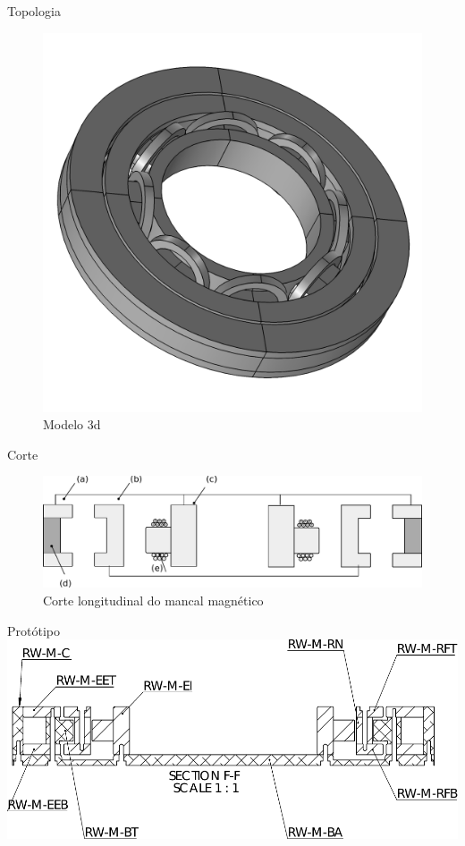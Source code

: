 \documentclass{beamer}
\begin{document}
\begin{frame}{Topologia}
\begin{figure}[th!]
\centering
	\includegraphics[width=0.8\linewidth]{../../Dissertacao/Figs/mancais/modelo-elementos-finitos.png}
\caption*{Modelo 3d}
\end{figure}
\end{frame}

\begin{frame}{Corte}
\begin{figure}[th!]
\centering
\includegraphics[width=1\linewidth]{../../Dissertacao/Figs/mancais/mancal_corte2}
\caption*{Corte longitudinal do mancal magnético}
\end{figure}
\end{frame}

\begin{frame}{Protótipo}
\includegraphics[width=1\linewidth]{prototipo/corte}
\end{frame}
\end{document}
